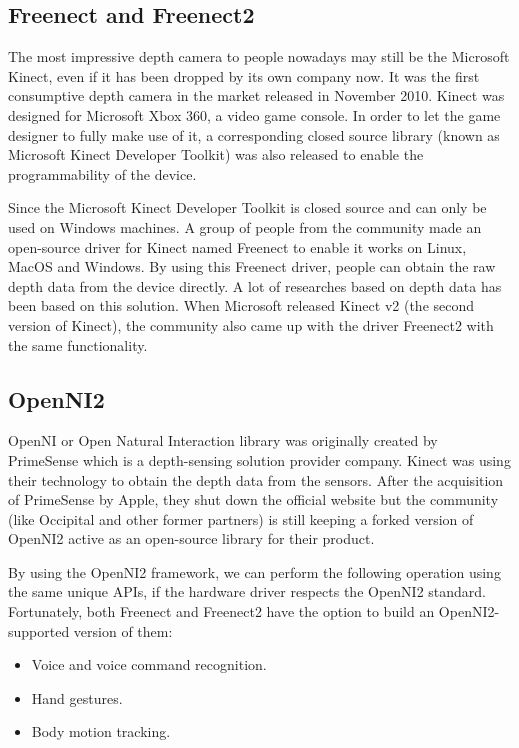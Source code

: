 \subsection{Freenect and Freenect2}
\label{sec:related_work_openiss_freenect}
The most impressive depth camera to people nowadays may still be the Microsoft 
Kinect, even if it has been dropped by its own company now. It was the first 
consumptive depth camera in the market released in November 2010. Kinect was
designed for Microsoft Xbox 360, a video game console. In order to let the game 
designer to fully make use of it, a corresponding closed source library (known 
as Microsoft Kinect Developer Toolkit) was also released to enable the 
programmability of the device.

Since the Microsoft Kinect Developer Toolkit is closed source and can only be 
used on Windows machines. A group of people from the community made an 
open-source driver for Kinect named Freenect to enable it works on Linux, MacOS
and Windows. By using this Freenect driver, people can obtain the raw depth 
data from the device directly. A lot of researches based on depth data has 
been based on this solution. When Microsoft released Kinect v2 (the second version
of Kinect), the community also came up with the driver Freenect2 with the same 
functionality.

\subsection{OpenNI2}

OpenNI or Open Natural Interaction library was originally created by PrimeSense 
which is a depth-sensing solution provider company. Kinect was using their 
technology to obtain the depth data from the sensors. After the
acquisition of PrimeSense by Apple, they shut down the official website but the 
community (like Occipital and other former partners) is still keeping a forked 
version of OpenNI2 active as an open-source library for their product.

By using the OpenNI2 framework, we can perform the following operation using the
same unique APIs, if the hardware driver respects the OpenNI2 standard.
Fortunately, both Freenect and Freenect2 have the option to build an 
OpenNI2-supported version of them:

\begin{itemize}
    \item Voice and voice command recognition.
    \item Hand gestures.
    \item Body motion tracking.
\end{itemize}

